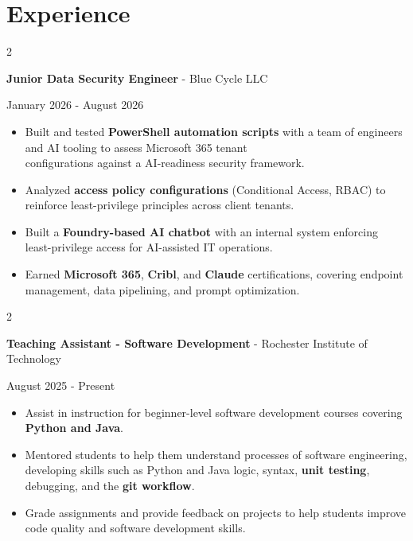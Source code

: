 \documentclass[10pt, letterpaper]{article}
\newenvironment{highlights}{
    \begin{itemize}[
        topsep=0.10 cm,
        parsep=0.10 cm,
        partopsep=0pt,
        itemsep=0pt,
        leftmargin=0.4 cm + 10pt
    ]
}{
    \end{itemize}
} %
\newenvironment{twocolentry}[2][]{
    \onecolentry
    \def\secondColumn{#2}
    \setcolumnwidth{\fill, 4.5 cm}
    \begin{paracol}{2}
}{
    \switchcolumn \raggedleft \secondColumn
    \end{paracol}
    \endonecolentry
} %
\begin{document}
    \vspace{-0.2cm}
    
    \section{Experience}

\begin{twocolentry}
    {January 2026 - August 2026}
    {\textbf{Junior Data Security Engineer} - Blue Cycle LLC}
\end{twocolentry}
\begin{highlights}
    \item Built and tested {\color{purple}\textbf{PowerShell automation scripts}} with a team of engineers and AI tooling to assess Microsoft 365 tenant \\ configurations against a AI-readiness security framework. 
    \item Analyzed {\color{purple}\textbf{access policy configurations}} (Conditional Access, RBAC) to reinforce least-privilege principles across client tenants.
    \item Built a {\color{purple}\textbf{Foundry-based AI chatbot}} with an internal system enforcing least-privilege access for AI-assisted IT operations.
    \item Earned {\color{purple}\textbf{Microsoft 365}}, {\color{purple}\textbf{Cribl}}, and {\color{purple}\textbf{Claude}} certifications, covering endpoint management, data pipelining, and prompt optimization.
\end{highlights}
\vspace{0.05 cm}
\begin{twocolentry}
    {August 2025 - Present}
    {\textbf{Teaching Assistant - Software Development} - Rochester Institute of Technology}
\end{twocolentry}        
            \begin{highlights}
            \item Assist in instruction for beginner-level software development courses covering {\color{purple}\textbf{Python and Java}}.
            \item Mentored students to help them understand processes of software engineering, developing skills such as Python and Java logic, syntax, {\color{purple}\textbf{unit testing}}, debugging, and the  {\color{purple}\textbf{git workflow}}.
            \item Grade assignments and provide feedback on projects to help students improve code quality and software development skills.
            \end{highlights}
\end{document}
